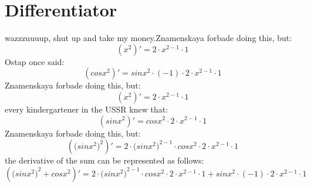 \documentclass{article}
\begin{document}
\section{Differentiator}
wazzzuuuup, shut up and take my money.\newline Znamenskaya forbade doing this, but: $$ ({ {  x  }  ^  {  2  } })' = { {  {  2  }  \cdot  {  {  x  }  ^  {  {  2  }  -  {  1  }  }  }  }  \cdot  {  1  } } $$
Ostap once said: $$ ({cos  {  {  x  }  ^  {  2  }  } })' = { {  { sin  {  {  x  }  ^  {  2  }  }  }  \cdot  {  (  -1  )  }  }  \cdot  {  {  {  2  }  \cdot  {  {  x  }  ^  {  {  2  }  -  {  1  }  }  }  }  \cdot  {  1  }  } } $$
Znamenskaya forbade doing this, but: $$ ({ {  x  }  ^  {  2  } })' = { {  {  2  }  \cdot  {  {  x  }  ^  {  {  2  }  -  {  1  }  }  }  }  \cdot  {  1  } } $$
every kindergartener in the USSR knew that: $$ ({sin  {  {  x  }  ^  {  2  }  } })' = { { cos  {  {  x  }  ^  {  2  }  }  }  \cdot  {  {  {  2  }  \cdot  {  {  x  }  ^  {  {  2  }  -  {  1  }  }  }  }  \cdot  {  1  }  } } $$
Znamenskaya forbade doing this, but: $$ ({ { (sin  {  {  x  }  ^  {  2  } ) }  }  ^  {  2  } })' = { {  {  2  }  \cdot  {  { (sin  {  {  x  }  ^  {  2  } ) }  }  ^  {  {  2  }  -  {  1  }  }  }  }  \cdot  {  { cos  {  {  x  }  ^  {  2  }  }  }  \cdot  {  {  {  2  }  \cdot  {  {  x  }  ^  {  {  2  }  -  {  1  }  }  }  }  \cdot  {  1  }  }  } } $$
the derivative of the sum can be represented as follows: $$ ({ {  { (sin  {  {  x  }  ^  {  2  } ) }  }  ^  {  2  }  }  +  { cos  {  {  x  }  ^  {  2  }  }  } })' = { {  {  {  2  }  \cdot  {  { (sin  {  {  x  }  ^  {  2  } ) }  }  ^  {  {  2  }  -  {  1  }  }  }  }  \cdot  {  { cos  {  {  x  }  ^  {  2  }  }  }  \cdot  {  {  {  2  }  \cdot  {  {  x  }  ^  {  {  2  }  -  {  1  }  }  }  }  \cdot  {  1  }  }  }  }  +  {  {  { sin  {  {  x  }  ^  {  2  }  }  }  \cdot  {  (  -1  )  }  }  \cdot  {  {  {  2  }  \cdot  {  {  x  }  ^  {  {  2  }  -  {  1  }  }  }  }  \cdot  {  1  }  }  } } $$
\end{document}
